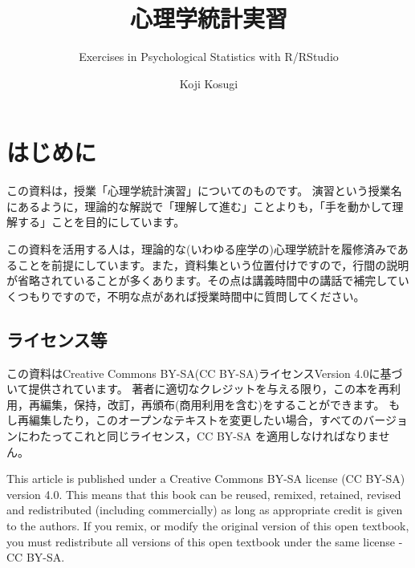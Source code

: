 \documentclass[
  a4paper,
]{ltjsbook}
\title{心理学統計実習}
\subtitle{Exercises in Psychological Statistics with R/RStudio}
\author{Koji Kosugi}
\date{}
\renewcommand*\contentsname{Table of contents}
\newcommand\contentsname{Table of contents}
\begin{document}
\maketitle

\renewcommand*\contentsname{Table of contents}
{
\hypersetup{linkcolor=}
\setcounter{tocdepth}{2}
\tableofcontents
}


\chapter*{はじめに}\label{ux306fux3058ux3081ux306b}


この資料は，授業「心理学統計演習」についてのものです。
演習という授業名にあるように，理論的な解説で「理解して進む」ことよりも，「手を動かして理解する」ことを目的にしています。

この資料を活用する人は，理論的な(いわゆる座学の)心理学統計を履修済みであることを前提にしています。また，資料集という位置付けですので，行間の説明が省略されていることが多くあります。その点は講義時間中の講話で補完していくつもりですので，不明な点があれば授業時間中に質問してください。

\section*{ライセンス等}\label{ux30e9ux30a4ux30bbux30f3ux30b9ux7b49}


この資料はCreative Commons BY-SA(CC BY-SA)ライセンスVersion
4.0に基づいて提供されています。
著者に適切なクレジットを与える限り，この本を再利用，再編集，保持，改訂，再頒布(商用利用を含む)をすることができます。
もし再編集したり，このオープンなテキストを変更したい場合，すべてのバージョンにわたってこれと同じライセンス，CC
BY-SA を適用しなければなりません。

This article is published under a Creative Commons BY-SA license (CC
BY-SA) version 4.0. This means that this book can be reused, remixed,
retained, revised and redistributed (including commercially) as long as
appropriate credit is given to the authors. If you remix, or modify the
original version of this open textbook, you must redistribute all
versions of this open textbook under the same license - CC BY-SA.

\end{document}
